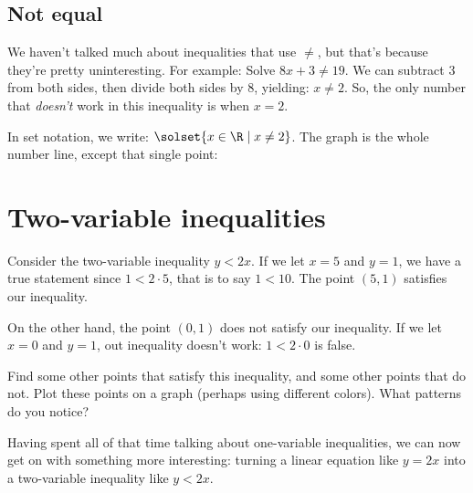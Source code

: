 \subsection{Not equal}

We haven't talked much about inequalities that use $\neq$, but that's because they're pretty uninteresting. For example: Solve $8x + 3 \neq 19$. We can subtract 3 from both sides, then divide both sides by 8, yielding: $x \neq 2$. So, the only number that \textit{doesn't} work in this inequality is when $x=2$.

In set notation, we write: $\solset{ x \in \R \mid x \neq 2}$. The graph is the whole number line, except that single point:
\begin{center}
\end{center}

\section{Two-variable inequalities}
\label{sec:ineqtwovar}

\begin{boxedexplore}
Consider the two-variable inequality $y < 2x$. If we let $x=5$ and $y=1$, we have a true statement since $1 < 2\cdot5$, that is to say $1<10$. The point $(5,1)$ satisfies our inequality.

On the other hand, the point $(0,1)$ does not satisfy our inequality. If we let $x=0$ and $y=1$, out inequality doesn't work: $1<2\cdot0$ is false.

Find some other points that satisfy this inequality, and some other points that do not. Plot these points on a graph (perhaps using different colors). What patterns do you notice?
\end{boxedexplore}

Having spent all of that time talking about one-variable inequalities, we can now get on with something more interesting: turning a linear equation like $y = 2x$ into a two-variable inequality like $y < 2x$.

